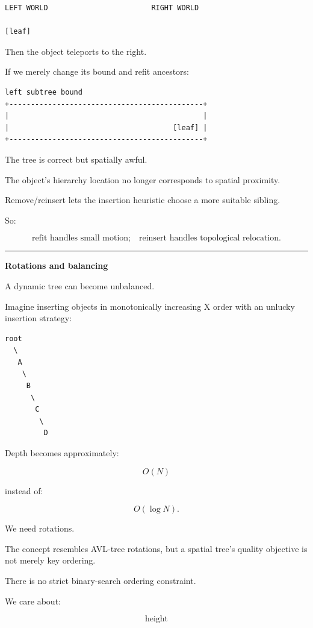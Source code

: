 \begin{verbatim}
LEFT WORLD                        RIGHT WORLD

[leaf]
\end{verbatim}

Then the object teleports to the right.

If we merely change its bound and refit ancestors:

\begin{verbatim}
left subtree bound
+---------------------------------------------+
|                                             |
|                                      [leaf] |
+---------------------------------------------+
\end{verbatim}

The tree is correct but spatially awful.

The object's hierarchy location no longer corresponds to spatial proximity.

Remove/reinsert lets the insertion heuristic choose a more suitable sibling.

So:

\[
\boxed{
\text{refit handles small motion;}
\quad
\text{reinsert handles topological relocation.}
}
\]

\begin{center}\rule{0.5\linewidth}{0.5pt}\end{center}

\textbf{Rotations and balancing}

A dynamic tree can become unbalanced.

Imagine inserting objects in monotonically increasing X order with an unlucky insertion strategy:

\begin{verbatim}
root
  \
   A
    \
     B
      \
       C
        \
         D
\end{verbatim}

Depth becomes approximately:

\[
O(N)
\]

instead of:

\[
O(\log N).
\]

We need rotations.

The concept resembles AVL-tree rotations, but a spatial tree's quality objective is not merely key ordering.

There is no strict binary-search ordering constraint.

We care about:

\[
\text{height}
\]

